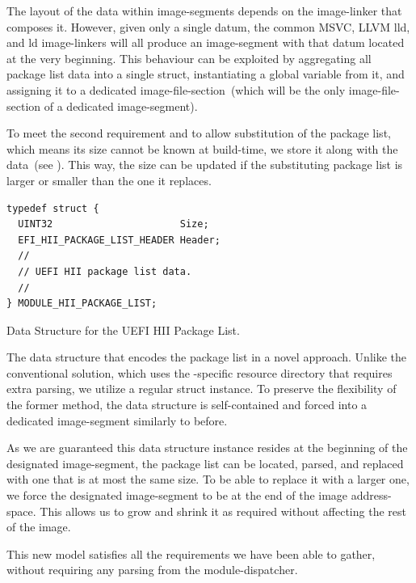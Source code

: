 The layout of the data within \glspl{image-segment} depends on the \gls{image-linker} that composes it. However, given only a single datum, the common \gls{MSVC}, LLVM lld, and  ld \glspl{image-linker} will all produce an \gls{image-segment} with that datum located at the very beginning. This behaviour can be exploited by aggregating all  package list data into a single  struct, instantiating a global variable from it, and assigning it to a dedicated \gls{image-file-section}~(which will be the only \gls{image-file-section} of a dedicated \gls{image-segment}).

To meet the second requirement and to allow substitution of the  package list, which means its size cannot be known at build-time, we store it along with the data~(see ). This way, the size can be updated if the substituting  package list is larger or smaller than the one it replaces.

\begin{lstfloat}[htb]
  \centering
  \begin{lstlisting}[style=c]
typedef struct {
  UINT32                      Size;
  EFI_HII_PACKAGE_LIST_HEADER Header;
  //
  // UEFI HII package list data.
  //
} MODULE_HII_PACKAGE_LIST;
  \end{lstlisting}
  \caption{Data Structure for the UEFI HII Package List.}
  \label{fig:new_hii_image}
  \caption*{The data structure that encodes the  package list in a novel approach. Unlike the conventional  solution, which uses the -specific resource directory that requires extra parsing, we utilize a regular  struct instance. To preserve the flexibility of the former method, the data structure is self-contained and forced into a dedicated \gls{image-segment} similarly to before.}
\end{lstfloat}

As we are guaranteed this data structure instance resides at the beginning of the designated \gls{image-segment}, the  package list can be located, parsed, and replaced with one that is at most the same size. To be able to replace it with a larger one, we force the designated \gls{image-segment} to be at the end of the \gls{image} \gls{address-space}. This allows us to grow and shrink it as required without affecting the rest of the \gls{image}.

This new model satisfies all the requirements we have been able to gather, without requiring any parsing from the \gls{module-dispatcher}.

